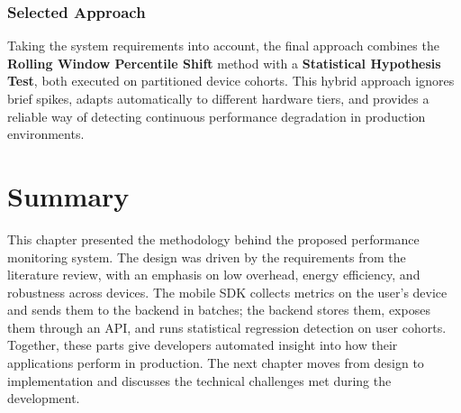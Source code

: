 \subsubsection{Selected Approach}
Taking the system requirements into account, the final approach combines the \textbf{Rolling Window Percentile Shift} method with a \textbf{Statistical Hypothesis Test}, both executed on partitioned device cohorts. This hybrid approach ignores brief spikes, adapts automatically to different hardware tiers, and provides a reliable way of detecting continuous performance degradation in production environments.

\section{Summary}

This chapter presented the methodology behind the proposed performance monitoring system. The design was driven by the requirements from the literature review, with an emphasis on low overhead, energy efficiency, and robustness across devices. The mobile SDK collects metrics on the user's device and sends them to the backend in batches; the backend stores them, exposes them through an API, and runs statistical regression detection on user cohorts. Together, these parts give developers automated insight into how their applications perform in production. The next chapter moves from design to implementation and discusses the technical challenges met during the development.
